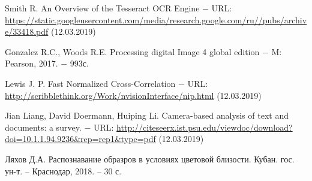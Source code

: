 \documentclass[oneside,final,14pt]{extreport}
\newcommand{\urlTitle}{ $-$ URL: }
\begin{document}
\newpage
\begin{thebibliography}{0}

Smith R. An Overview of the Tesseract OCR Engine \urlTitle
\url{https://static.googleusercontent.com/media/research.google.com/ru//pubs/archive/33418.pdf} (12.03.2019)

  Gonzalez R.C.,  Woods R.E. Processing digital Image 4 global edition $-$ M: Pearson, 2017. $-$ 993с. 

Lewis J. P. Fast Normalized Cross-Correlation 
\urlTitle \url{http://scribblethink.org/Work/nvisionInterface/nip.html} (12.03.2019)

﻿Jian Liang, David Doermann, Huiping Li. Camera-based analysis of text and documents: a survey. \urlTitle \url{http://citeseerx.ist.psu.edu/viewdoc/download?doi=10.1.1.94.9236&rep=rep1&type=pdf} (12.03.2019)


 Ляхов Д.А. Распознавание образров в условиях цветовой близости.  Кубан. гос. ун-т. – Краснодар, 2018. – 30 с.

\end{thebibliography}
\end{document}

